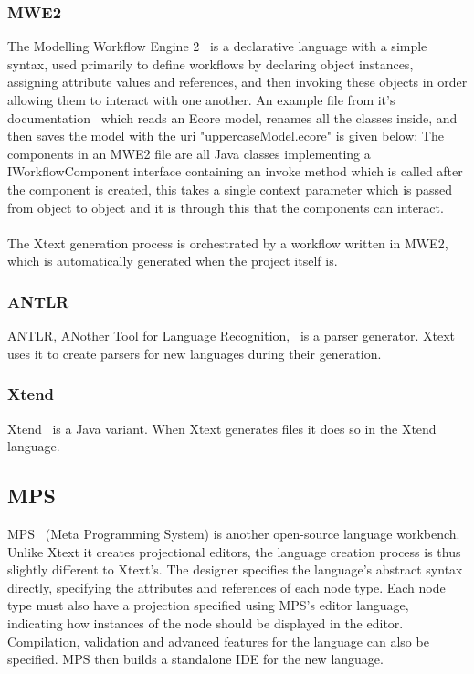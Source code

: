 \documentclass{article}
\begin{document}
\subsubsection{MWE2}
The Modelling Workflow Engine 2~\cite{mwe2} is a declarative language with a simple syntax, used primarily to define workflows by declaring object instances, assigning attribute values and references, and then invoking these objects in order allowing them to interact with one another. An example file from it's documentation~\cite{mwe2} which reads an Ecore model, renames all the classes inside, and then saves the model with the uri "uppercaseModel.ecore" is given below: 
The components in an MWE2 file are all Java classes implementing a IWorkflowComponent interface containing an invoke method which is called after the component is created, this takes a single context parameter which is passed from object to object and it is through this that the components can interact. 
\\
\\
The Xtext generation process is orchestrated by a workflow written in MWE2, which is automatically generated when the project itself is.
\subsubsection{ANTLR}
ANTLR, ANother Tool for Language Recognition,~\cite{antlr} is a parser generator. Xtext uses it to create parsers for new languages during their generation.
\subsubsection{Xtend}
Xtend~\cite{xtend} is a Java variant. When Xtext generates files it does so in the Xtend language.
\subsection{MPS}\label{mps}
MPS~\cite{mps} (Meta Programming System) is another open-source language workbench. Unlike Xtext it creates projectional editors, the language creation process is thus slightly different to Xtext's. The designer specifies the language's abstract syntax directly, specifying the attributes and references of each node type. Each node type must also have a projection specified using MPS's editor language, indicating how instances of the node should be displayed in the editor. Compilation, validation and advanced features for the language can also be specified. MPS then builds a standalone IDE for the new language. 
\end{document}
